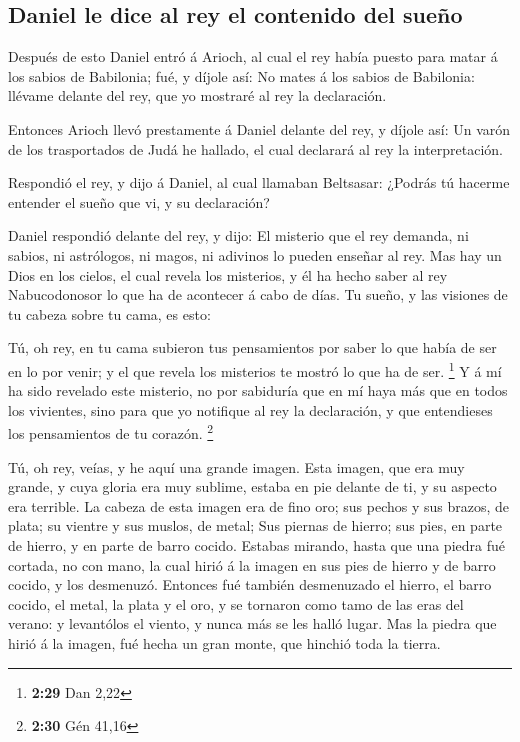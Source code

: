 \hypertarget{daniel-le-dice-al-rey-el-contenido-del-sueuxf1o}{%
\subsection{Daniel le dice al rey el contenido del
sueño}\label{daniel-le-dice-al-rey-el-contenido-del-sueuxf1o}}

 Después de esto Daniel entró á Arioch, al cual el rey
había puesto para matar á los sabios de Babilonia; fué, y díjole así: No
mates á los sabios de Babilonia: llévame delante del rey, que yo
mostraré al rey la declaración.

 Entonces Arioch llevó prestamente á Daniel delante del
rey, y díjole así: Un varón de los trasportados de Judá he hallado, el
cual declarará al rey la interpretación.

 Respondió el rey, y dijo á Daniel, al cual llamaban
Beltsasar: ¿Podrás tú hacerme entender el sueño que vi, y su
declaración?

 Daniel respondió delante del rey, y dijo: El misterio
que el rey demanda, ni sabios, ni astrólogos, ni magos, ni adivinos lo
pueden enseñar al rey.  Mas hay un Dios en los cielos, el
cual revela los misterios, y él ha hecho saber al rey Nabucodonosor lo
que ha de acontecer á cabo de días. Tu sueño, y las visiones de tu
cabeza sobre tu cama, es esto:

 Tú, oh rey, en tu cama subieron tus pensamientos por
saber lo que había de ser en lo por venir; y el que revela los misterios
te mostró lo que ha de ser. \footnote{\textbf{2:29} Dan 2,22}
 Y á mí ha sido revelado este misterio, no por sabiduría
que en mí haya más que en todos los vivientes, sino para que yo
notifique al rey la declaración, y que entendieses los pensamientos de
tu corazón. \footnote{\textbf{2:30} Gén 41,16}

 Tú, oh rey, veías, y he aquí una grande imagen. Esta
imagen, que era muy grande, y cuya gloria era muy sublime, estaba en pie
delante de ti, y su aspecto era terrible.  La cabeza de
esta imagen era de fino oro; sus pechos y sus brazos, de plata; su
vientre y sus muslos, de metal;  Sus piernas de hierro;
sus pies, en parte de hierro, y en parte de barro cocido.
 Estabas mirando, hasta que una piedra fué cortada, no
con mano, la cual hirió á la imagen en sus pies de hierro y de barro
cocido, y los desmenuzó.  Entonces fué también
desmenuzado el hierro, el barro cocido, el metal, la plata y el oro, y
se tornaron como tamo de las eras del verano: y levantólos el viento, y
nunca más se les halló lugar. Mas la piedra que hirió á la imagen, fué
hecha un gran monte, que hinchió toda la tierra.

